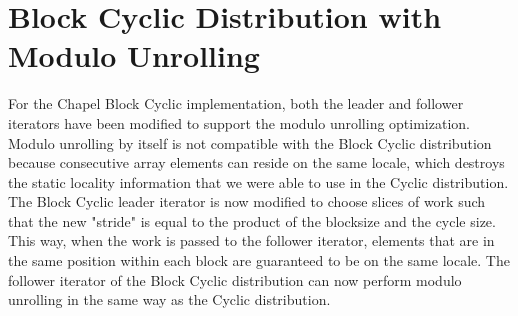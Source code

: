 \section{Block Cyclic Distribution with Modulo Unrolling}\label{sec:block_cyclic_modulo}

For the Chapel Block Cyclic implementation, both the leader and follower iterators have been modified to support the modulo unrolling optimization. Modulo unrolling by itself is not compatible with the Block Cyclic distribution because consecutive array elements can reside on the same locale, which destroys the static locality information that we were able to use in the Cyclic distribution. The Block Cyclic leader iterator is now modified to choose slices of work such that the new "stride" is equal to the product of the blocksize and the cycle size. This way, when the work is passed to the follower iterator, elements that are in the same position within each block are guaranteed to be on the same locale. The follower iterator of the Block Cyclic distribution can now perform modulo unrolling in the same way as the Cyclic distribution. 